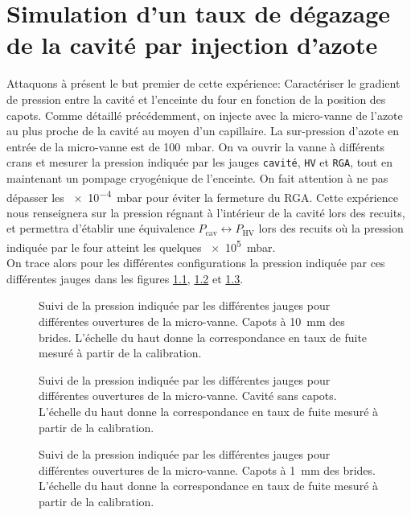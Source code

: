 \chapter{Simulation d'un taux de dégazage de la cavité par injection d'azote}
Attaquons à présent le but premier de cette expérience: Caractériser le gradient de pression entre la cavité et l'enceinte du four en fonction de la position des capots. Comme détaillé précédemment, on injecte avec la micro-vanne de l'azote au plus proche de la cavité au moyen d'un capillaire. La sur-pression d'azote en entrée de la micro-vanne est de \SI{+100}{\milli\bar}. On va ouvrir la vanne à différents crans et mesurer la pression indiquée par les jauges \texttt{cavité}, \texttt{HV} et \texttt{RGA}, tout en maintenant un pompage cryogénique de l'enceinte. On fait attention à ne pas dépasser les \SI{e-4}{\milli\bar} pour éviter la fermeture du RGA. Cette expérience nous renseignera sur la pression régnant à l'intérieur de la cavité lors des recuits, et permettra d'établir une équivalence $P_\text{cav} \longleftrightarrow P_\text{HV}$ lors des recuits où la pression indiquée par le four atteint les quelques \SI{e5}{\milli\bar}.\\
On trace alors pour les différentes configurations la pression indiquée par ces différentes jauges dans les figures \ref{fig:ouvertureVanne_sansCapots}, \ref{fig:ouvertureVanne_10mm} et \ref{fig:ouvertureVanne_1mm}.

\begin{figure}
    \centering
    
    \caption{Suivi de la pression indiquée par les différentes jauges pour différentes ouvertures de la micro-vanne. Capots à \SI{10}{\milli\meter} des brides. L'échelle du haut donne la correspondance en taux de fuite mesuré à partir de la calibration.}
    \label{fig:ouvertureVanne_sansCapots}
\end{figure}

\begin{figure}
    \centering
    
    \caption{Suivi de la pression indiquée par les différentes jauges pour différentes ouvertures de la micro-vanne. Cavité sans capots. L'échelle du haut donne la correspondance en taux de fuite mesuré à partir de la calibration.}
    \label{fig:ouvertureVanne_10mm}
\end{figure}

\begin{figure}
    \centering
    
    \caption{Suivi de la pression indiquée par les différentes jauges pour différentes ouvertures de la micro-vanne. Capots à \SI{1}{\milli\meter} des brides. L'échelle du haut donne la correspondance en taux de fuite mesuré à partir de la calibration.}
    \label{fig:ouvertureVanne_1mm}
\end{figure}

